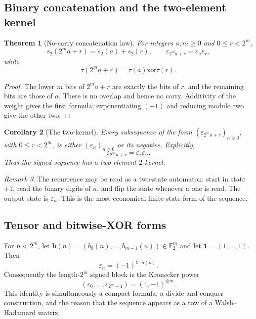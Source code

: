\documentclass[11pt,oneside]{article}
\newtheorem{theorem}{Theorem}[section]
\newtheorem{corollary}[theorem]{Corollary}
\theoremstyle{definition}
\theoremstyle{remark}
\newtheorem{remark}[theorem]{Remark}
\newcommand{\F}{\mathbb F}
\newcommand{\swt}{s_2}
\newcommand{\eps}{\varepsilon}
\newcommand{\xor}{\mathbin{\mathsf{xor}}}
\newcommand{\1}{\mathbf 1}
\begin{document}
\subsection{Binary concatenation and the two-element kernel}

\begin{theorem}[No-carry concatenation law]
\label{p3:thm:concat}
For integers \(a,m\ge0\) and \(0\le r<2^m\),
\begin{equation}
 \swt(2^ma+r)=\swt(a)+\swt(r),
 \qquad
 \eps_{2^ma+r}=\eps_a\eps_r,
 \label{p3:eq:concat-sign}
\end{equation}
while
\begin{equation}
 \tau(2^ma+r)=\tau(a)\xor\tau(r).
 \label{p3:eq:concat-bit}
\end{equation}
\end{theorem}

\begin{proof}
The lower \(m\) bits of \(2^ma+r\) are exactly the bits of \(r\), and the remaining bits are
those of \(a\).  There is no overlap and hence no carry.  Additivity of the weight gives the
first formula; exponentiating \((-1)\) and reducing modulo two give the other two.
\end{proof}

\begin{corollary}[The two-kernel]
\label{p3:cor:2kernel}
Every subsequence of the form \((\eps_{2^mn+r})_{n\ge0}\), with \(0\le r<2^m\), is either
\((\eps_n)_{n\ge0}\) or its negative.  Explicitly,
\begin{equation}
 \eps_{2^mn+r}=\eps_r\eps_n.
 \label{p3:eq:kernel}
\end{equation}
Thus the signed sequence has a two-element \(2\)-kernel.
\end{corollary}

\begin{remark}
The recurrence may be read as a two-state automaton: start in state \(+1\), read the binary
digits of \(n\), and flip the state whenever a one is read.  The output state is \(\eps_n\).
This is the most economical finite-state form of the sequence.
\end{remark}

\subsection{Tensor and bitwise-XOR forms}

For \(n<2^m\), let \(\bm b(n)=(b_0(n),\ldots,b_{m-1}(n))\in\F_2^m\) and let
\(\bm1=(1,\ldots,1)\).  Then
\begin{equation}
 \eps_n=(-1)^{\bm1\cdot\bm b(n)}.
 \label{p3:eq:parity-character}
\end{equation}
Consequently the length-\(2^m\) signed block is the Kronecker power
\begin{equation}
 (\eps_0,\ldots,\eps_{2^m-1})=(1,-1)^{\otimes m}.
 \label{p3:eq:tensor}
\end{equation}
This identity is simultaneously a compact formula, a divide-and-conquer construction, and the
reason that the sequence appears as a row of a Walsh--Hadamard matrix.
\end{document}
